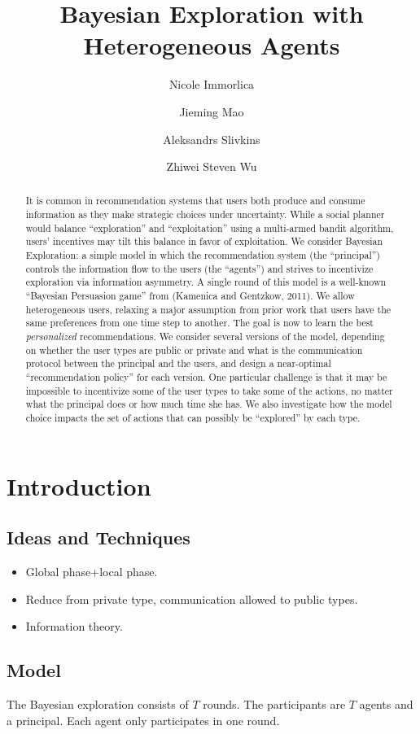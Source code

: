 \documentclass[11pt]{article}
\title{Bayesian Exploration with Heterogeneous Agents}
\author{
Nicole Immorlica
\and
Jieming Mao
\and
Aleksandrs Slivkins
\and
Zhiwei Steven Wu
}
\begin{document}
\maketitle


\begin{abstract}
It is common in recommendation systems that users both produce and consume information as they make strategic choices under uncertainty. While a social planner would balance “exploration” and “exploitation” using a multi-armed bandit algorithm, users’ incentives may tilt this balance in favor of exploitation. We consider Bayesian Exploration: a simple model in which the recommendation system (the “principal”) controls the information flow to the users (the “agents”) and strives to incentivize exploration via information asymmetry. A single round of this model is a well-known “Bayesian Persuasion game” from (Kamenica and Gentzkow, 2011). We allow heterogeneous users, relaxing a major assumption from prior work that users have the same preferences from one time step to another. The goal is now to learn the best \emph{personalized} recommendations. We consider several versions of the model, depending on whether the user types are public or private and what is the communication protocol between the principal and the users, and design a near-optimal “recommendation policy” for each version. One particular challenge is that it may be impossible to incentivize some of the user types to take some of the actions, no matter what the principal does or how much time she has. We also investigate how the model choice impacts the set of actions that can possibly be “explored” by each type.
\end{abstract}

\section{Introduction}

\subsection{Ideas and Techniques}
\begin{itemize}
\item Global phase+local phase.
\item Reduce from private type, communication allowed to public types.
\item Information theory.
\end{itemize}

\subsection{Model}
The Bayesian exploration consists of $T$ rounds. The participants are $T$ agents and a principal. Each agent only participates in one round.
\end{document}
